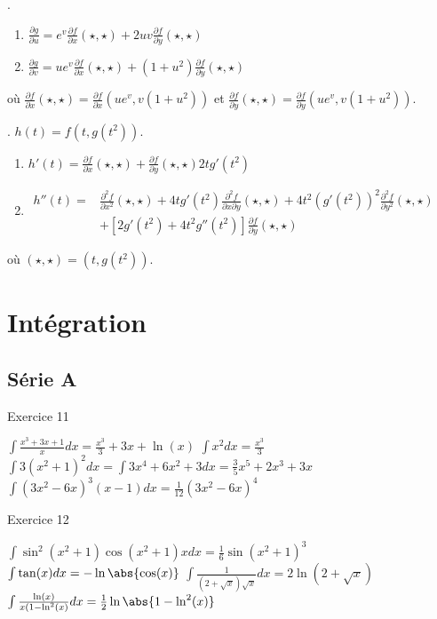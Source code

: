 .
\begin{enumerate}
	\item $\frac{ \partial g }{ \partial u } = e^v\frac{ \partial f }{ \partial x }(\star,\star)+2uv\frac{ \partial f }{ \partial y }(\star,\star)$
	\item $\frac{ \partial g }{ \partial v } = ue^v\frac{ \partial f }{ \partial x }(\star,\star)+(1+u^2)\frac{ \partial f }{ \partial y }(\star,\star)$
\end{enumerate}
o\`{u} $\frac{ \partial f }{ \partial x }(\star,\star) = \frac{ \partial f }{ \partial x }(ue^v,v(1+u^2))$ et $\frac{ \partial f }{ \partial y }(\star,\star) = \frac{ \partial f }{ \partial y }(ue^v,v(1+u^2))$.

. $h(t)=f(t,g(t^2))$.\\

\begin{enumerate}
	\item $h'(t)=\frac{ \partial f }{ \partial x }(\star,\star)+\frac{ \partial f }{ \partial y }(\star,\star)2tg'(t^2)$
	\item $ \begin{array}{rl} h''(t)= & \frac{ \partial^2f }{ \partial x^2 }(\star,\star)+4tg'(t^2)\frac{ \partial^2f }{ \partial x\partial y }(\star,\star)+4t^2(g'(t^2))^2\frac{ \partial^2f }{ \partial y^2 }(\star,\star) \\
                          & +[2g'(t^2)+4t^2g''(t^2)]\frac{ \partial f }{ \partial y }(\star,\star)\end{array}$

\end{enumerate}
où $(\star,\star) = (t,g(t^2))$.




\section{Intégration}
\subsection{Série A}
Exercice 11
\begin{enumerate}
	\exr $\int \frac{x^3+3x+1}{x} d x = \frac{x^3}3 + 3x + \ln(x)$%
	\exr $\int x^2d x = \frac{x^3}3$%
	\exr $\int 3(x^2+1)^2 d x = \int 3 x^4 + 6 x^2 + 3 d x = \frac 35
		x^5 + 2 x^3 + 3x$%
	\exr $\int (3x^2 - 6x)^3 (x-1) d x = \frac1{12} (3x^2 - 6x)^4$
\end{enumerate}

Exercice 12
\begin{enumerate}
	\exr $\int \sin^2(x^2+1) \cos(x^2+1) x d x = \frac16
		\sin(x^2+1)^3$%
	\exr $\int \tan(x) d x = -\ln\abs{\cos(x)}$%
	\exr $\int \frac{1}{(2+\sqrt{x})\sqrt x} d x= 2 \ln(2+\sqrt{x})$%
	\exr $\int \frac{\ln(x)}{x(1- \ln^2(x)} d x = \frac12
		\ln\abs{1-\ln^2(x)}$%
\end{enumerate}



